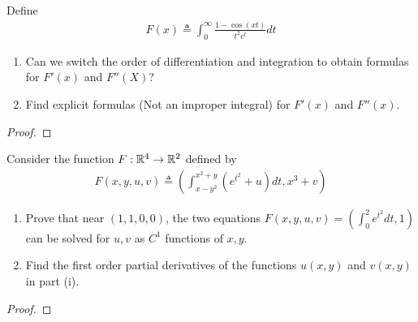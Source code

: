 \documentclass{report}
\begin{document}
\begin{question}{}{}
Define 
\begin{align*}
F(x)\triangleq \int_0^{\infty} \frac{1-\cos (xt)}{t^2e^t}dt
\end{align*}
\begin{enumerate}[label=(\roman*)]
  \item Can we switch the order of differentiation and integration to obtain formulas for $F'(x)$ and $F''(X)$? 
  \item Find explicit formulas (Not an improper integral) for $F'(x)$ and $F''(x)$.  
\end{enumerate}
\end{question}
\begin{proof}

\end{proof}
\begin{question}{}{}
Consider the function $F:\mathbb{R}^4\rightarrow \mathbb{R}^2$ defined by 
\begin{align*}
F(x,y,u,v)\triangleq \left(\int_{x-y^2}^{x^2+y}(e^{t^2}+u)dt,x^3+v \right)
\end{align*}
\begin{enumerate}[label=(\roman*)]
  \item Prove that near $(1,1,0,0)$, the two equations $F(x,y,u,v)=(\int_0^2 e^{t^2}dt,1)$ can be solved for $u,v$ as  $C^1$ functions of  $x,y$.  
  \item Find the first order partial derivatives of the functions $u(x,y)$ and $v(x,y)$ in part (i). 
\end{enumerate}
\end{question}
\begin{proof}

\end{proof}
\end{document}
